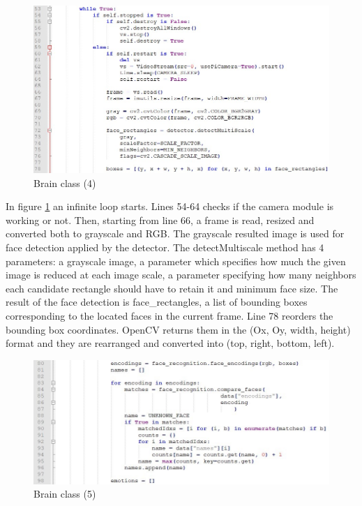 \documentclass[runningheads,a4paper,12pt]{report}
\begin{document}
\begin{figure}[h]
	\centering
	\includegraphics[width=\linewidth]{./images/3_brain4}\hfill	
	\caption{Brain class (4)}  
    \label{fig:3_brain4}
\end{figure}

In figure \ref{fig:3_brain4} an infinite loop starts. Lines 54-64 checks if the camera module is working or not. Then, starting from line 66, a frame is read, resized and converted both to grayscale and RGB. The grayscale resulted image is used for face detection applied by the detector. The detectMultiscale method has 4 parameters: a grayscale image, a parameter which specifies how much the given image is reduced at each image scale, a parameter specifying how many neighbors each candidate rectangle should have to retain it and minimum face size. The result of the face detection is face\_rectangles, a list of bounding boxes corresponding to the located faces in the current frame. Line 78 reorders the bounding box coordinates. OpenCV returns them in the (Ox, Oy, width, height) format and they are rearranged and converted into (top, right, bottom, left).

\begin{figure}[h]
	\centering
	\includegraphics[width=\linewidth]{./images/3_brain5}\hfill	
	\caption{Brain class (5)}  
    \label{fig:3_brain5}
\end{figure}
\end{document}
